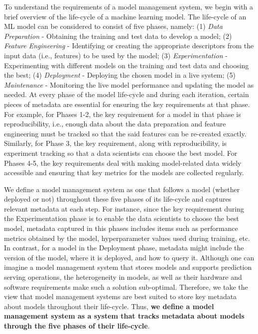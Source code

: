 \documentclass[11pt]{article}
\newcommand{\dss}{data scientists\xspace}
\begin{document}
To understand the requirements of a model management system, we begin with a brief overview of the life-cycle of a machine learning model.
The life-cycle of an ML model can be considered to consist of five phases, namely: 
(1) {\em Data Preparation} - Obtaining the training and test data to develop a model; 
(2) {\em Feature Engineering} - Identifying or creating the appropriate descriptors from the input data (i.e., features) to be used by the model; 
(3) {\em Experimentation} - Experimenting with different models on the training and test data and choosing the best; 
(4) {\em Deployment} - Deploying the chosen model in a live system; 
(5) {\em Maintenance} - Monitoring the live model performance and updating the model as needed.
At every phase of the model life-cycle and during each iteration, certain pieces of metadata are essential for ensuring the key requirements at that phase.
For example, for Phases 1-2, the key requirement for a model in that phase is reproducibility, i.e., enough data about the data preparation and feature engineering must be tracked so that the said features can be re-created exactly.
Similarly, for Phase 3, the key requirement, along with reproducibility, is experiment tracking so that a \dss can choose the best model.
For Phases 4-5, the key requirements deal with making model-related data widely accessible and ensuring that key metrics for the models are collected regularly.

\newpage

We define a model management system as one that follows a model (whether deployed or not) throughout these five phases of its life-cycle and captures relevant metadata at each step.
For instance, since the key requirement during the Experimentation phase is to enable the \dss to choose the best model, metadata captured in this phases includes items such as performance metrics obtained by the model, hyperparameter values used during training, etc.
In contrast, for a model in the Deployment phase, metadata might include the version of the model, where it is deployed, and how to query it.
Although one can imagine a model management system that stores models and supports prediction serving operations, the heterogeneity in models, as well as their hardware and software requirements make such a solution sub-optimal.
Therefore, we take the view that model management systems are best suited to store key metadata about models throughout their life-cycle.
Thus, {\bf we define a model management system as a system that tracks metadata about models through the five phases of their life-cycle}.
\end{document}
